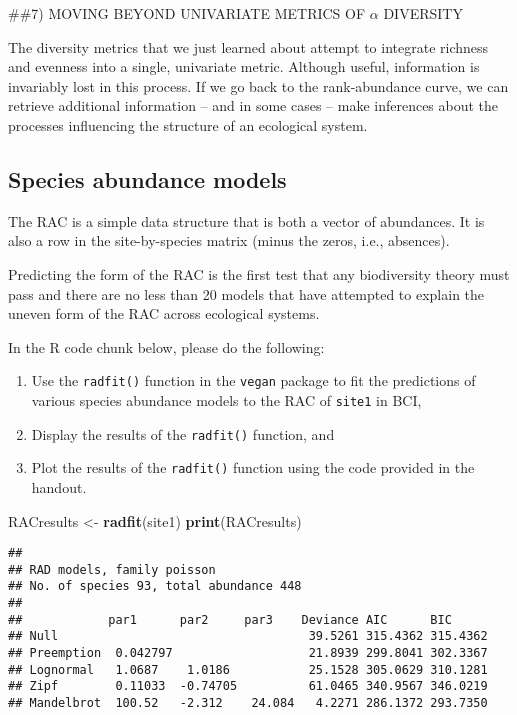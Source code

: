 \documentclass[
]{article}
\newenvironment{Shaded}{\begin{snugshade}}{\end{snugshade}}
\newcommand{\FunctionTok}[1]{\textcolor[rgb]{0.13,0.29,0.53}{\textbf{#1}}}
\newcommand{\NormalTok}[1]{#1}
\newcommand{\OtherTok}[1]{\textcolor[rgb]{0.56,0.35,0.01}{#1}}
\begin{document}
\#\#7) MOVING BEYOND UNIVARIATE METRICS OF \(\alpha\) DIVERSITY

The diversity metrics that we just learned about attempt to integrate
richness and evenness into a single, univariate metric. Although useful,
information is invariably lost in this process. If we go back to the
rank-abundance curve, we can retrieve additional information -- and in
some cases -- make inferences about the processes influencing the
structure of an ecological system.

\subsection{Species abundance models}\label{species-abundance-models}

The RAC is a simple data structure that is both a vector of abundances.
It is also a row in the site-by-species matrix (minus the zeros, i.e.,
absences).

Predicting the form of the RAC is the first test that any biodiversity
theory must pass and there are no less than 20 models that have
attempted to explain the uneven form of the RAC across ecological
systems.

In the R code chunk below, please do the following:

\begin{enumerate}
\def\labelenumi{\arabic{enumi}.}
\item
  Use the \texttt{radfit()} function in the \texttt{vegan} package to
  fit the predictions of various species abundance models to the RAC of
  \texttt{site1} in BCI,
\item
  Display the results of the \texttt{radfit()} function, and
\item
  Plot the results of the \texttt{radfit()} function using the code
  provided in the handout.
\end{enumerate}

\begin{Shaded}
\begin{Highlighting}[]
\NormalTok{RACresults }\OtherTok{\textless{}{-}} \FunctionTok{radfit}\NormalTok{(site1)}
\FunctionTok{print}\NormalTok{(RACresults)}
\end{Highlighting}
\end{Shaded}

\begin{verbatim}
## 
## RAD models, family poisson 
## No. of species 93, total abundance 448
## 
##            par1      par2     par3    Deviance AIC      BIC     
## Null                                   39.5261 315.4362 315.4362
## Preemption  0.042797                   21.8939 299.8041 302.3367
## Lognormal   1.0687    1.0186           25.1528 305.0629 310.1281
## Zipf        0.11033  -0.74705          61.0465 340.9567 346.0219
## Mandelbrot  100.52   -2.312    24.084   4.2271 286.1372 293.7350
\end{verbatim}
\end{document}
